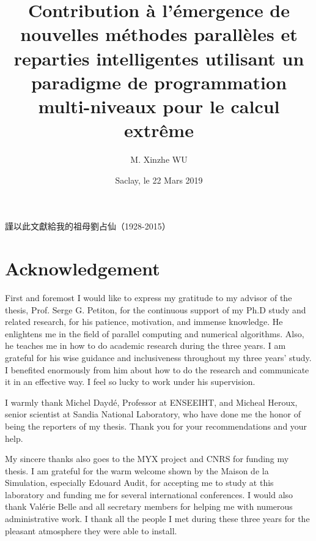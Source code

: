 \documentclass{xinzhewu}
\title{\Large \textrm{Contribution \`a l’\'emergence de nouvelles m\'ethodes parall\`eles et reparties intelligentes utilisant un paradigme de programmation multi-niveaux pour le calcul extr\^eme}}
\author{M. Xinzhe WU}
\date{Saclay, le 22 Mars 2019}
\makeatletter
\newcommand*\bigcdot{\mathpalette\bigcdot@{.5}}
\newcommand*\bigcdot@[2]{\mathbin{\vcenter{\hbox{\scalebox{#2}{$\m@th#1\bullet$}}}}}
\newenvironment{dedication}
{\clearpage           %
	\thispagestyle{empty}%
	\vspace*{\stretch{1}}%
	\itshape             %
	\raggedleft          %
}
{\par %
	\vspace{\stretch{3}} %
	\clearpage           %
}
\makeatother
\begin{document}
\maketitle
 
\clearemptydoublepage
\begin{dedication}
	\normalsize
	
	\vspace{0.2in}
	\begin{CJK*}{UTF8}{bsmi}
		{
			\large
			謹以此文獻給我的祖母劉占仙（1928-2015）}
	\end{CJK*}

\iffalse
\begin{textblock*}{\textwidth}(6cm,4cm)
	
	\begin{CJK*}{UTF8}{bsmi}
		\centerline{{\CJKfamily{bkai}戊戌年 $\bigcdot$小寒}}
		\centerline{{\CJKfamily{bkai}巴黎城}}
		\centerline{{\CJKfamily{bkai}歡鵲壘新巢}}
	\end{CJK*}
\end{textblock*}
\fi

\end{dedication}

\clearemptydoublepage

\chapter*{Acknowledgement}
\thispagestyle{empty}

First and foremost I would like to express my gratitude to my advisor of the thesis, Prof. Serge G. Petiton, for the continuous support of my Ph.D study and related research, for his patience, motivation, and immense knowledge. He enlightens me in the field of parallel computing and numerical algorithms. Also, he teaches me in how to do academic research during the three years. I am grateful for his wise guidance and inclusiveness throughout my three years' study. I benefited enormously from him about how to do the research and communicate it in an effective way. I feel so lucky to work under his supervision.

I warmly thank Michel Dayd\'e, Professor at ENSEEIHT, and Micheal Heroux, senior scientist at Sandia National Laboratory, who have done me the honor of being the reporters of my thesis. Thank you for your recommendations and your help.

My sincere thanks also goes to the MYX project and CNRS for funding my thesis. I am grateful for the warm welcome shown by the Maison de la Simulation, especially Edouard Audit, for accepting me to study at this laboratory and funding me for several international conferences. I would also thank Val\'erie Belle and all secretary members for helping me with numerous administrative work. I thank all the people I met during these three years for the pleasant atmosphere they were able to install. 
\end{document}
